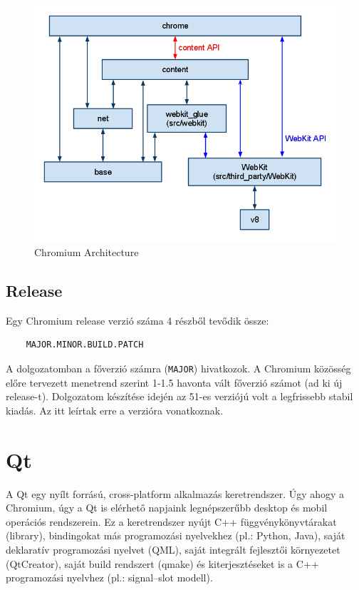 \documentclass[12pt]{report}
\begin{document}
\begin{figure}[ht]
    \centering
    \includegraphics[scale=0.6]{chromium-architecture}
    \caption{
        \label{fig:chromium-architecture}
        Chromium Architecture \cite{bib:chromium-content-module}
    }
\end{figure}


\subsection{Release}
Egy Chromium release verzió száma 4 részből tevődik össze:
\begin{verbatim}
    MAJOR.MINOR.BUILD.PATCH
\end{verbatim}
A dolgozatomban a főverzió számra (\texttt{MAJOR}) hivatkozok.
A Chromium közösség előre tervezett menetrend szerint 1-1.5 havonta vált főverzió számot
(ad ki új release-t).
Dolgozatom készítése idején az 51-es verziójú volt a legfrissebb stabil kiadás.
Az itt leírtak erre a verzióra vonatkoznak.


\section{Qt}
A Qt egy nyílt forrású, cross-platform alkalmazás keretrendszer. Úgy ahogy a Chromium, úgy a
Qt is elérhető napjaink legnépszerűbb desktop és mobil operációs rendszerein. Ez a
keretrendszer nyújt C++ függvénykönyvtárakat (library), bindingokat más programozási
nyelvekhez (pl.: Python, Java), saját deklaratív programozási nyelvet (QML), saját integrált
fejlesztői környezetet (QtCreator), saját build rendszert (qmake) és kiterjesztéseket is a
C++ programozási nyelvhez (pl.: signal--slot modell).
\cite{bib:qt-wiki-about-qt}
\end{document}
